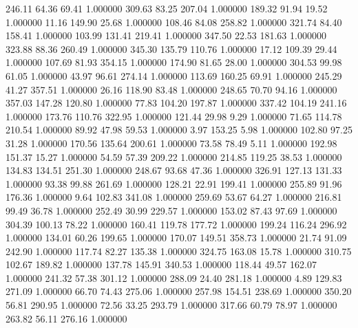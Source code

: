     246.11     64.36     69.41  1.000000
    309.63     83.25    207.04  1.000000
    189.32     91.94     19.52  1.000000
     11.16    149.90     25.68  1.000000
    108.46     84.08    258.82  1.000000
    321.74     84.40    158.41  1.000000
    103.99    131.41    219.41  1.000000
    347.50     22.53    181.63  1.000000
    323.88     88.36    260.49  1.000000
    345.30    135.79    110.76  1.000000
     17.12    109.39     29.44  1.000000
    107.69     81.93    354.15  1.000000
    174.90     81.65     28.00  1.000000
    304.53     99.98     61.05  1.000000
     43.97     96.61    274.14  1.000000
    113.69    160.25     69.91  1.000000
    245.29     41.27    357.51  1.000000
     26.16    118.90     83.48  1.000000
    248.65     70.70     94.16  1.000000
    357.03    147.28    120.80  1.000000
     77.83    104.20    197.87  1.000000
    337.42    104.19    241.16  1.000000
    173.76    110.76    322.95  1.000000
    121.44     29.98      9.29  1.000000
     71.65    114.78    210.54  1.000000
     89.92     47.98     59.53  1.000000
      3.97    153.25      5.98  1.000000
    102.80     97.25     31.28  1.000000
    170.56    135.64    200.61  1.000000
     73.58     78.49      5.11  1.000000
    192.98    151.37     15.27  1.000000
     54.59     57.39    209.22  1.000000
    214.85    119.25     38.53  1.000000
    134.83    134.51    251.30  1.000000
    248.67     93.68     47.36  1.000000
    326.91    127.13    131.33  1.000000
     93.38     99.88    261.69  1.000000
    128.21     22.91    199.41  1.000000
    255.89     91.96    176.36  1.000000
      9.64    102.83    341.08  1.000000
    259.69     53.67     64.27  1.000000
    216.81     99.49     36.78  1.000000
    252.49     30.99    229.57  1.000000
    153.02     87.43     97.69  1.000000
    304.39    100.13     78.22  1.000000
    160.41    119.78    177.72  1.000000
    199.24    116.24    296.92  1.000000
    134.01     60.26    199.65  1.000000
    170.07    149.51    358.73  1.000000
     21.74     91.09    242.90  1.000000
    117.74     82.27    135.38  1.000000
    324.75    163.08     15.78  1.000000
    310.75    102.67    189.82  1.000000
    137.78    145.91    340.53  1.000000
    118.44     49.57    162.07  1.000000
    241.32     57.38    301.12  1.000000
    288.09     24.40    281.18  1.000000
      4.89    129.83    271.09  1.000000
     66.70     74.43    275.06  1.000000
    257.98    154.51    238.69  1.000000
    350.20     56.81    290.95  1.000000
     72.56     33.25    293.79  1.000000
    317.66     60.79     78.97  1.000000
    263.82     56.11    276.16  1.000000
